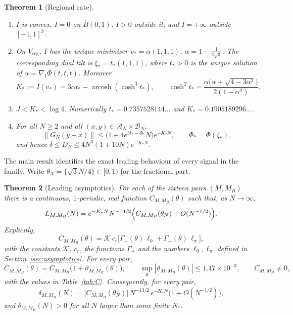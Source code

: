 \documentclass[11pt]{amsart}
\newtheorem{theorem}{Theorem}[section]
\theoremstyle{definition}
\theoremstyle{remark}
\newcommand{\cA}{\mathcal{A}}
\newcommand{\cB}{\mathcal{B}}
\newcommand{\cK}{\mathcal{K}}
\newcommand{\arcosh}{\operatorname{arcosh}}
\begin{document}
\begin{theorem}[Regional rate]\label{thm:rate}
\begin{enumerate}[label=(\alph*)]
\item $I$ is convex, $I=0$ on $\overline B(0,1)$, $I>0$ outside it, and
  $I=+\infty$ outside $[-1,1]^3$.
\item On $V_{\mathrm{reg}}$, $I$ has the unique minimiser
  $v_*=\alpha(1,1,1)$, $\alpha=1-\frac1{2\sqrt3}$.  The corresponding dual
  tilt is $\xi_*=t_*(1,1,1)$, where $t_*>0$ is the unique solution of
  $\alpha=\nabla_1\Phi(t,t,t)$.  Moreover
  \[
  K_*:=I(v_*)=3\alpha t_*-\arcosh(\cosh^3t_*),\qquad
  \cosh^2t_*=\frac{\alpha\bigl(\alpha+\sqrt{4-3\alpha^2}\bigr)}{2(1-\alpha^2)} .
  \]
\item $J<K_*<\log4$.  Numerically $t_*=0.7357528144\ldots$ and
  $K_*=0.1905189296\ldots$.
\item For all $N\ge2$ and all $(x,y)\in\cA_N\times\cB_N$,
  \[
  \|G_N(y-x)\|\le\bigl(1+4e^{3t_*-\Phi_*}N\bigr)e^{-K_*N},\qquad \Phi_*=\Phi(\xi_*),
  \]
  and hence $\delta\le D_B\le4N^3(1+10N)e^{-K_*N}$.
\end{enumerate}
\end{theorem}

The main result identifies the exact leading behaviour of every signal in
the family.  Write $\theta_N=\{\sqrt3N/4\}\in[0,1)$ for the fractional part.

\begin{theorem}[Leading asymptotics]\label{thm:main}
For each of the sixteen pairs $(M,M_B)$ there is a continuous, $1$-periodic,
real function $C_{M,M_B}(\theta)$ such that, as $N\to\infty$,
\[
L_{M,M_B}(N)=e^{-K_*N}N^{-13/2}\Bigl(C_{M,M_B}(\theta_N)+O(N^{-1/2})\Bigr).
\]
Explicitly,
\begin{equation}\label{eq:C}
C_{M,M_B}(\theta)=\cK\,c_r\bigl[\Gamma_+(\theta)\,\ell_0+\Gamma_-(\theta)\,\ell_\pi\bigr],
\end{equation}
with the constants $\cK$, $c_r$, the functions $\Gamma_\pm$ and the numbers
$\ell_0,\ell_\pi$ defined in Section~\ref{sec:asymptotics}.  For every pair,
\[
C_{M,M_B}(\theta)=\overline C_{M,M_B}\bigl(1+\vartheta_{M,M_B}(\theta)\bigr),
\qquad \sup_\theta|\vartheta_{M,M_B}(\theta)|\le1.47\times10^{-3},
\qquad \overline C_{M,M_B}\ne0,
\]
with the values in Table~\ref{tab:C}.  Consequently, for every pair,
\[
\delta_{M,M_B}(N)=\bigl|C_{M,M_B}(\theta_N)\bigr|\,N^{-13/2}\,e^{-K_*N}\bigl(1+O(N^{-1/2})\bigr),
\]
and $\delta_{M,M_B}(N)>0$ for all $N$ larger than some finite $N_*$.
\end{theorem}
\end{document}
